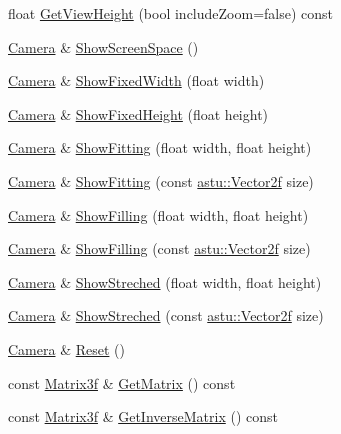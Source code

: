 \begin{DoxyCompactItemize}
\item 
float \hyperlink{classastu_1_1suite2d_1_1Camera_a0b6bb41b626a34accbebcae80adc7a7b}{Get\+View\+Height} (bool include\+Zoom=false) const
\item 
\hyperlink{classastu_1_1suite2d_1_1Camera}{Camera} \& \hyperlink{classastu_1_1suite2d_1_1Camera_a9bfad2b33a3dc2f1c3581ae9e9bb177f}{Show\+Screen\+Space} ()
\item 
\hyperlink{classastu_1_1suite2d_1_1Camera}{Camera} \& \hyperlink{classastu_1_1suite2d_1_1Camera_a54880a7c259cd32f2313a7062118f294}{Show\+Fixed\+Width} (float width)
\item 
\hyperlink{classastu_1_1suite2d_1_1Camera}{Camera} \& \hyperlink{classastu_1_1suite2d_1_1Camera_a8e5b6040037566353c110ca8dcabdb47}{Show\+Fixed\+Height} (float height)
\item 
\hyperlink{classastu_1_1suite2d_1_1Camera}{Camera} \& \hyperlink{classastu_1_1suite2d_1_1Camera_a5c6c40c17d8c21961888541c7aef6baf}{Show\+Fitting} (float width, float height)
\item 
\hyperlink{classastu_1_1suite2d_1_1Camera}{Camera} \& \hyperlink{classastu_1_1suite2d_1_1Camera_a191692f6b99f00380cc0660ce155086a}{Show\+Fitting} (const \hyperlink{classastu_1_1Vector2}{astu\+::\+Vector2f} size)
\item 
\hyperlink{classastu_1_1suite2d_1_1Camera}{Camera} \& \hyperlink{classastu_1_1suite2d_1_1Camera_a2d6d21250d02dfa510d4584b32186b25}{Show\+Filling} (float width, float height)
\item 
\hyperlink{classastu_1_1suite2d_1_1Camera}{Camera} \& \hyperlink{classastu_1_1suite2d_1_1Camera_acf376d632203455b7b9f5ce91b7704fe}{Show\+Filling} (const \hyperlink{classastu_1_1Vector2}{astu\+::\+Vector2f} size)
\item 
\hyperlink{classastu_1_1suite2d_1_1Camera}{Camera} \& \hyperlink{classastu_1_1suite2d_1_1Camera_ad20b708f44ce1ef1ff68214370c823d3}{Show\+Streched} (float width, float height)
\item 
\hyperlink{classastu_1_1suite2d_1_1Camera}{Camera} \& \hyperlink{classastu_1_1suite2d_1_1Camera_af92dc2a15adcba875cdac653b44b546e}{Show\+Streched} (const \hyperlink{classastu_1_1Vector2}{astu\+::\+Vector2f} size)
\item 
\hyperlink{classastu_1_1suite2d_1_1Camera}{Camera} \& \hyperlink{classastu_1_1suite2d_1_1Camera_a58db2b6c0e45ed32c5f06d4780940635}{Reset} ()
\item 
const \hyperlink{classastu_1_1Matrix3}{Matrix3f} \& \hyperlink{classastu_1_1suite2d_1_1Camera_a55247c21a90994449b512080989e2e1c}{Get\+Matrix} () const
\item 
const \hyperlink{classastu_1_1Matrix3}{Matrix3f} \& \hyperlink{classastu_1_1suite2d_1_1Camera_a92019ffd5becbde98ef768a2fc86da41}{Get\+Inverse\+Matrix} () const
\end{DoxyCompactItemize}
